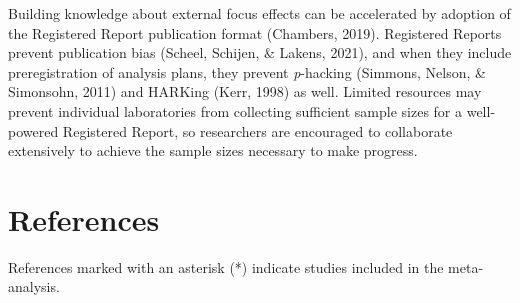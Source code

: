 \documentclass[
  man, donotrepeattitle,floatsintext]{apa7}
\begin{document}
Building knowledge about external focus effects can be accelerated by adoption of the Registered Report publication format (Chambers, 2019). Registered Reports prevent publication bias (Scheel, Schijen, \& Lakens, 2021), and when they include preregistration of analysis plans, they prevent \emph{p}-hacking (Simmons, Nelson, \& Simonsohn, 2011) and HARKing (Kerr, 1998) as well. Limited resources may prevent individual laboratories from collecting sufficient sample sizes for a well-powered Registered Report, so researchers are encouraged to collaborate extensively to achieve the sample sizes necessary to make progress.

\newpage

\hypertarget{references}{%
\section{References}\label{references}}

References marked with an asterisk (*) indicate studies included in the meta-analysis.

\vspace{2ex}
\end{document}
